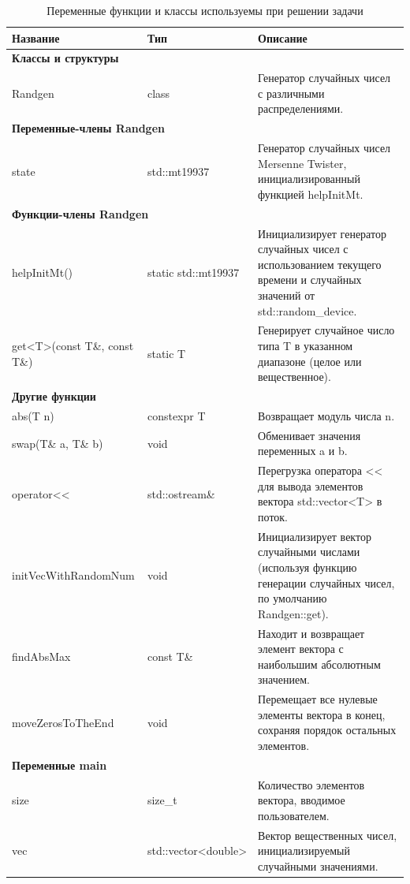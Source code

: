 \documentclass[14pt,a4paper]{article}
\begin{document}
\begin{table}[H]
  \centering
  \begin{tabular}{|l|l|p{8cm}|}
    \hline
    \textbf{Название} & \textbf{Тип} & \textbf{Описание} \\ \hline
    \multicolumn{3}{|l|}{\textbf{Классы и структуры}} \\ \hline
    Randgen & class & Генератор случайных чисел с различными распределениями.
    \\ \hline
    \multicolumn{3}{|l|}{\textbf{Переменные-члены Randgen}} \\ \hline
    state & std::mt19937 & Генератор случайных чисел Mersenne Twister,
    инициализированный функцией helpInitMt. \\ \hline
    \multicolumn{3}{|l|}{\textbf{Функции-члены Randgen}} \\ \hline
    helpInitMt() & static std::mt19937 & Инициализирует генератор случайных
    чисел с использованием текущего времени и случайных значений от
    std::random\_device. \\ \hline
    get<T>(const T\&, const T\&) & static T & Генерирует случайное число типа T
    в указанном диапазоне (целое или вещественное). \\ \hline
    \multicolumn{3}{|l|}{\textbf{Другие функции}} \\ \hline
    abs(T n) & constexpr T & Возвращает модуль числа n. \\ \hline
    swap(T\& a, T\& b) & void & Обменивает значения переменных a и b. \\ \hline
    operator<< & std::ostream\& & Перегрузка оператора << для вывода элементов
    вектора std::vector<T> в поток. \\ \hline
    initVecWithRandomNum & void & Инициализирует вектор случайными числами
    (используя функцию генерации случайных чисел, по умолчанию Randgen::get).
    \\ \hline
    findAbsMax & const T\& & Находит и возвращает элемент вектора с наибольшим
    абсолютным значением. \\ \hline
    moveZerosToTheEnd & void & Перемещает все нулевые элементы вектора в конец,
    сохраняя порядок остальных элементов. \\ \hline
    \multicolumn{3}{|l|}{\textbf{Переменные main}} \\ \hline
    size & size\_t & Количество элементов вектора, вводимое пользователем. \\
    \hline
    vec & std::vector<double> & Вектор вещественных чисел, инициализируемый
    случайными значениями. \\ \hline
  \end{tabular}
  \caption{Переменные функции и классы используемы при решении задачи}
  \label{tabel:1}
\end{table}
\end{document}
